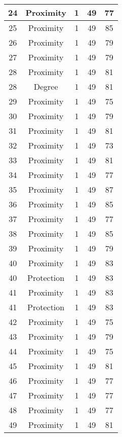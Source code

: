\documentclass[results.tex]{subfiles}
\begin{document}
\begin{center}
\begin{tabular}{| c || c | c | c | c |}
    \hline
    24 & Proximity & 1 & 49 & 77 \\ 
    \hline
    25 & Proximity & 1 & 49 & 85 \\ 
    \hline
    26 & Proximity & 1 & 49 & 79 \\ 
    \hline
    27 & Proximity & 1 & 49 & 79 \\ 
    \hline
    28 & Proximity & 1 & 49 & 81 \\ 
    \hline
    28 & Degree & 1 & 49 & 81 \\ 
    \hline
    29 & Proximity & 1 & 49 & 75 \\ 
    \hline
    30 & Proximity & 1 & 49 & 79 \\ 
    \hline
    31 & Proximity & 1 & 49 & 81 \\ 
    \hline
    32 & Proximity & 1 & 49 & 73 \\ 
    \hline
    33 & Proximity & 1 & 49 & 81 \\ 
    \hline
    34 & Proximity & 1 & 49 & 77 \\ 
    \hline
    35 & Proximity & 1 & 49 & 87 \\ 
    \hline
    36 & Proximity & 1 & 49 & 85 \\ 
    \hline
    37 & Proximity & 1 & 49 & 77 \\ 
    \hline
    38 & Proximity & 1 & 49 & 85 \\ 
    \hline
    39 & Proximity & 1 & 49 & 79 \\ 
    \hline
    40 & Proximity & 1 & 49 & 83 \\ 
    \hline
    40 & Protection & 1 & 49 & 83 \\ 
    \hline
    41 & Proximity & 1 & 49 & 83 \\ 
    \hline
    41 & Protection & 1 & 49 & 83 \\ 
    \hline
    42 & Proximity & 1 & 49 & 75 \\ 
    \hline
    43 & Proximity & 1 & 49 & 79 \\ 
    \hline
    44 & Proximity & 1 & 49 & 75 \\ 
    \hline
    45 & Proximity & 1 & 49 & 81 \\ 
    \hline
    46 & Proximity & 1 & 49 & 77 \\ 
    \hline
    47 & Proximity & 1 & 49 & 77 \\ 
    \hline
    48 & Proximity & 1 & 49 & 77 \\ 
    \hline
    49 & Proximity & 1 & 49 & 81 \\ 
    \hline   \end{tabular}
\end{center}
\end{document}
